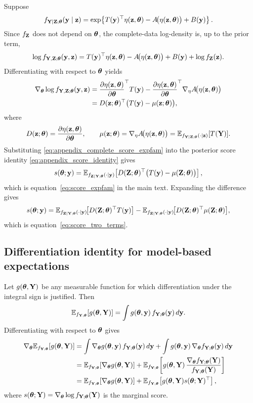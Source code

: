 \documentclass[twoside,11pt]{article}
\begin{document}
Suppose
\[
f_{{\bf Y}\mid{\bf Z};{\bm{\theta}}}({\bf y}\mid {\bf z})
=
\exp\!\left\{
T({\bf y})^\top \eta({\bf z},{\bm{\theta}})
-
A\!\bigl(\eta({\bf z},{\bm{\theta}})\bigr)
+
B({\bf y})
\right\}.
\]
Since \(f_{\bf Z}\) does not depend on \({\bm{\theta}}\), the complete-data log-density is, up to the prior term,
\[
\log f_{{\bf Y},{\bf Z};{\bm{\theta}}}({\bf y},{\bf z})
=
T({\bf y})^\top \eta({\bf z},{\bm{\theta}})
-
A\!\bigl(\eta({\bf z},{\bm{\theta}})\bigr)
+
B({\bf y})
+
\log f_{\bf Z}({\bf z}).
\]
Differentiating with respect to \({\bm{\theta}}\) yields
\begin{align}
\nabla_{\bm{\theta}} \log f_{{\bf Y},{\bf Z};{\bm{\theta}}}({\bf y},{\bf z})
&=
\frac{\partial \eta({\bf z},{\bm{\theta}})}{\partial {\bm{\theta}}}^\top T({\bf y})
-
\frac{\partial \eta({\bf z},{\bm{\theta}})}{\partial {\bm{\theta}}}^\top \nabla_\eta A\!\bigl(\eta({\bf z},{\bm{\theta}})\bigr)
\nonumber\\
&=
D({\bf z};{\bm{\theta}})^\top\bigl(T({\bf y})-\mu({\bf z};{\bm{\theta}})\bigr),
\label{eq:appendix_complete_score_expfam}
\end{align}
where
\[
D({\bf z};{\bm{\theta}})
=
\frac{\partial \eta({\bf z},{\bm{\theta}})}{\partial {\bm{\theta}}},
\qquad
\mu({\bf z};{\bm{\theta}})
=
\nabla_\eta A\!\bigl(\eta({\bf z},{\bm{\theta}})\bigr)
=
\mathbb E_{f_{{\bf Y}\mid{\bf Z};{\bm{\theta}}}(\cdot\mid {\bf z})}[T({\bf Y})].
\]
Substituting \eqref{eq:appendix_complete_score_expfam} into the posterior score identity \eqref{eq:appendix_score_identity} gives
\[
s({\bm{\theta}};{\bf y})
=
\mathbb E_{f_{{\bf Z}\mid{\bf Y};{\bm{\theta}}}(\cdot\mid {\bf y})}
\!\left[
D({\bf Z};{\bm{\theta}})^\top\bigl(T({\bf y})-\mu({\bf Z};{\bm{\theta}})\bigr)
\right],
\]
which is equation~\eqref{eq:score_expfam} in the main text. Expanding the difference gives
\[
s({\bm{\theta}};{\bf y})
=
\mathbb E_{f_{{\bf Z}\mid{\bf Y};{\bm{\theta}}}(\cdot\mid {\bf y})}
\!\bigl[D({\bf Z};{\bm{\theta}})^\top T({\bf y})\bigr]
-
\mathbb E_{f_{{\bf Z}\mid{\bf Y};{\bm{\theta}}}(\cdot\mid {\bf y})}
\!\bigl[D({\bf Z};{\bm{\theta}})^\top \mu({\bf Z};{\bm{\theta}})\bigr],
\]
which is equation~\eqref{eq:score_two_terms}.

\subsection{Differentiation identity for model-based expectations}
\label{apx:diff-identity}

Let \(g({\bm{\theta}},{\bf Y})\) be any measurable function for which differentiation under the integral sign is justified. Then
\[
\mathbb E_{f_{{\bf Y};{\bm{\theta}}}}\!\left[g({\bm{\theta}},{\bf Y})\right]
=
\int g({\bm{\theta}},{\bf y})\,f_{{\bf Y};{\bm{\theta}}}({\bf y})\,d{\bf y}.
\]
Differentiating with respect to \({\bm{\theta}}\) gives
\begin{align}
\nabla_{\bm{\theta}} \mathbb E_{f_{{\bf Y};{\bm{\theta}}}}\!\left[g({\bm{\theta}},{\bf Y})\right]
&=
\int \nabla_{\bm{\theta}} g({\bm{\theta}},{\bf y})\,f_{{\bf Y};{\bm{\theta}}}({\bf y})\,d{\bf y}
+
\int g({\bm{\theta}},{\bf y})\,\nabla_{\bm{\theta}} f_{{\bf Y};{\bm{\theta}}}({\bf y})\,d{\bf y}
\nonumber\\
&=
\mathbb E_{f_{{\bf Y};{\bm{\theta}}}}\!\left[\nabla_{\bm{\theta}} g({\bm{\theta}},{\bf Y})\right]
+
\mathbb E_{f_{{\bf Y};{\bm{\theta}}}}\!\left[
g({\bm{\theta}},{\bf Y})\,
\frac{\nabla_{\bm{\theta}} f_{{\bf Y};{\bm{\theta}}}({\bf Y})}{f_{{\bf Y};{\bm{\theta}}}({\bf Y})}
\right]
\nonumber\\
&=
\mathbb E_{f_{{\bf Y};{\bm{\theta}}}}\!\left[\nabla_{\bm{\theta}} g({\bm{\theta}},{\bf Y})\right]
+
\mathbb E_{f_{{\bf Y};{\bm{\theta}}}}\!\left[g({\bm{\theta}},{\bf Y})s({\bm{\theta}};{\bf Y})^\top\right],
\label{eq:appendix_diff_identity}
\end{align}
where \(s({\bm{\theta}};{\bf Y})=\nabla_{\bm{\theta}} \log f_{{\bf Y};{\bm{\theta}}}({\bf Y})\) is the marginal score.
\end{document}

